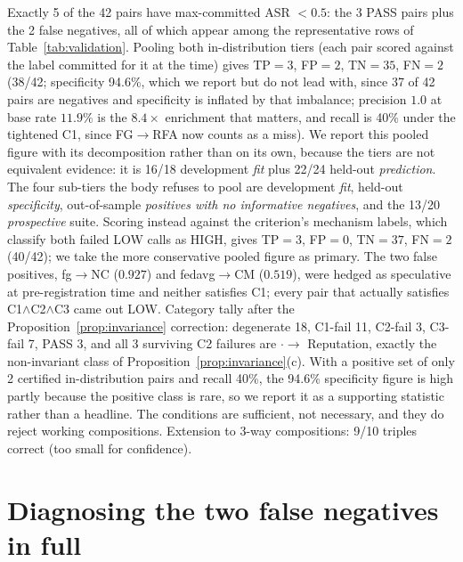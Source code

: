 \documentclass{article}
\begin{document}
Exactly 5 of the 42 pairs have max-committed ASR $< 0.5$: the 3 PASS pairs plus the 2 false negatives, all of which appear among the representative rows of Table~\ref{tab:validation}. Pooling both in-distribution tiers (each pair scored against the label committed for it at the time) gives TP${}=3$, FP${}=2$, TN${}=35$, FN${}=2$ (38/42; specificity 94.6\%, which we report but do not lead with, since 37 of 42 pairs are negatives and specificity is inflated by that imbalance; precision $1.0$ at base rate $11.9\%$ is the $8.4\times$ enrichment that matters, and recall is 40\% under the tightened C1, since FG$\to$RFA now counts as a miss). We report this pooled figure with its decomposition rather than on its own, because the tiers are not equivalent evidence: it is 16/18 development \emph{fit} plus 22/24 held-out \emph{prediction}. The four sub-tiers the body refuses to pool are development \emph{fit}, held-out \emph{specificity}, out-of-sample \emph{positives with no informative negatives}, and the 13/20 \emph{prospective} suite. Scoring instead against the criterion's mechanism labels, which classify both failed LOW calls as HIGH, gives TP${}=3$, FP${}=0$, TN${}=37$, FN${}=2$ (40/42); we take the more conservative pooled figure as primary. The two false positives, fg$\to$NC ($0.927$) and fedavg$\to$CM ($0.519$), were hedged as speculative at pre-registration time and neither satisfies C1; every pair that actually satisfies C1$\wedge$C2$\wedge$C3 came out LOW. Category tally after the Proposition~\ref{prop:invariance} correction: degenerate 18, C1-fail 11, C2-fail 3, C3-fail 7, PASS 3, and all 3 surviving C2 failures are $\cdot \to$ Reputation, exactly the non-invariant class of Proposition~\ref{prop:invariance}(c). With a positive set of only 2 certified in-distribution pairs and recall 40\%, the 94.6\% specificity figure is high partly because the positive class is rare, so we report it as a supporting statistic rather than a headline. The conditions are sufficient, not necessary, and they do reject working compositions. Extension to 3-way compositions: 9/10 triples correct (too small for confidence).

\section{Diagnosing the two false negatives in full}
\label{app:false_negatives}
\end{document}

